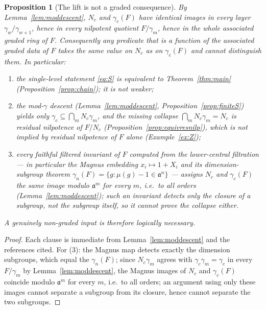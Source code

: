 \documentclass{amsart}
\newtheorem{proposition}{Proposition}
\theoremstyle{definition}
\theoremstyle{remark}
\begin{document}
\begin{proposition}[The lift is not a graded consequence]\label{prop:irreducible}
By Lemma~\ref{lem:moddescent}, $N_c$ and $\gamma_c(F)$ have identical images in every
layer $\gamma_w/\gamma_{w+1}$, hence in every nilpotent quotient $F/\gamma_m$, hence
in the whole associated graded ring of $F$. Consequently any predicate that is a
function of the associated graded data of $F$ takes the same value on $N_c$ as on
$\gamma_c(F)$ and cannot distinguish them. In particular:
\begin{enumerate}
\item[\textup{(1)}] the single-level statement \eqref{eq:S} is \emph{equivalent} to
Theorem~\ref{thm:main} \textup{(Proposition~\ref{prop:chain})}; it is not weaker;
\item[\textup{(2)}] the mod-$\gamma$ descent \textup{(Lemma~\ref{lem:moddescent},
Proposition~\ref{prop:finiteS})} yields only $\gamma_c\subseteq\bigcap_m
N_c\gamma_m$, and the missing collapse $\bigcap_m N_c\gamma_m=N_c$ is residual
nilpotence of $F/N_c$ \textup{(Proposition~\ref{prop:equivresnilp})}, which is
\emph{not} implied by residual nilpotence of $F$ alone \textup{(Example~\ref{ex:Z})};
\item[\textup{(3)}] every faithful filtered invariant of $F$ computed from the
lower-central filtration --- in particular the Magnus embedding $x_i\mapsto1+X_i$ and
its dimension-subgroup theorem $\gamma_n(F)=\{g:\mu(g)-1\in\mathfrak a^{n}\}$ ---
assigns $N_c$ and $\gamma_c(F)$ the same image modulo $\mathfrak a^{m}$ for every $m$,
i.e.\ to all orders \textup{(Lemma~\ref{lem:moddescent})}; such an invariant detects
only the \emph{closure} of a subgroup, not the subgroup itself, so it cannot prove the
collapse either.
\end{enumerate}
A genuinely non-graded input is therefore logically necessary.
\end{proposition}
\begin{proof}
Each clause is immediate from Lemma~\ref{lem:moddescent} and the references cited.
For (3): the Magnus map detects exactly the dimension subgroups, which equal the
$\gamma_n(F)$; since $N_c\gamma_m$ agrees with $\gamma_c\gamma_m=\gamma_c$ in every
$F/\gamma_m$ by Lemma~\ref{lem:moddescent}, the Magnus images of $N_c$ and
$\gamma_c(F)$ coincide modulo $\mathfrak a^{m}$ for every $m$, i.e.\ to all orders; an
argument using only these images cannot separate a subgroup from its closure, hence
cannot separate the two subgroups.
\end{proof}
\end{document}
